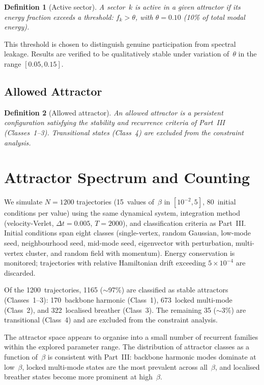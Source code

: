 \documentclass[12pt,a4paper]{article}
\newtheorem{definition}{Definition}
\begin{document}
\begin{definition}[Active sector]
A sector~$k$ is \emph{active} in a given attractor if its energy
fraction exceeds a threshold: $f_k > \theta$, with $\theta = 0.10$
(10\% of total modal energy).
\end{definition}

This threshold is chosen to distinguish genuine participation from
spectral leakage.  Results are verified to be qualitatively stable
under variation of~$\theta$ in the range $[0.05, 0.15]$.

\subsection{Allowed Attractor}

\begin{definition}[Allowed attractor]
An \emph{allowed attractor} is a persistent configuration satisfying
the stability and recurrence criteria of Part~III (Classes~1--3).
Transitional states (Class~4) are excluded from the constraint
analysis.
\end{definition}


\section{Attractor Spectrum and Counting}\label{sec:counting}

We simulate $N = 1200$ trajectories (15~values of~$\beta$ in
$[10^{-2}, 5]$, 80~initial conditions per value) using the same
dynamical system, integration method (velocity-Verlet, $\Delta t =
0.005$, $T = 2000$), and classification criteria as Part~III.
Initial conditions span eight classes (single-vertex, random Gaussian,
low-mode seed, neighbourhood seed, mid-mode seed, eigenvector with
perturbation, multi-vertex cluster, and random field with momentum).
Energy conservation is monitored; trajectories with relative
Hamiltonian drift exceeding $5 \times 10^{-4}$ are discarded.

Of the 1200~trajectories, 1165 ($\sim$97\%) are classified as stable
attractors (Classes~1--3): 170~backbone harmonic (Class~1),
673~locked multi-mode (Class~2), and 322~localised breather (Class~3).
The remaining 35 ($\sim$3\%) are transitional (Class~4) and are
excluded from the constraint analysis.

The attractor space appears to organise into a small number of
recurrent families within the explored parameter range.  The
distribution of attractor classes as a function of~$\beta$ is
consistent with Part~III: backbone harmonic modes dominate at
low~$\beta$, locked multi-mode states are the most prevalent across
all~$\beta$, and localised breather states become more prominent at
high~$\beta$.
\end{document}
